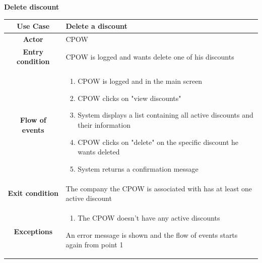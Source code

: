 \documentclass[table, 12pt]{article} %
\begin{document}
\begin{itemize}
            \begin{table}[H]
                \item[] \textbf{Delete discount}
                \item[]
                \centering
                \begin{tabular}{|c |m{}|}
                    \hline
                    \textbf{Use Case} & Delete a discount\\ \hline
                    \textbf{Actor} & CPOW\\ \hline
                    \textbf{Entry condition} & CPOW is logged and wants delete one of his discounts \\  \hline
                    \textbf{Flow of events} & \begin{enumerate}
                                                \item CPOW is logged and in the main screen
                                                \item CPOW clicks on "view discounts"
                                                \item System displays a list containing all active discounts and their information
                                                \item CPOW clicks on "delete" on the specific discount he wants deleted
                                                \item System returns a confirmation message
                                            \end{enumerate}\\ \hline
                    \textbf{Exit condition} &  The company the CPOW is associated with has at least one active discount\\ \hline
                    \textbf{Exceptions} &  \begin{enumerate}
                        \item The CPOW doesn't have any active discounts
                    \end{enumerate}
                    An error message is shown and the flow of events starts again from point 1\\ \hline
                \end{tabular}
            \end{table}



\end{itemize}
\end{document}
